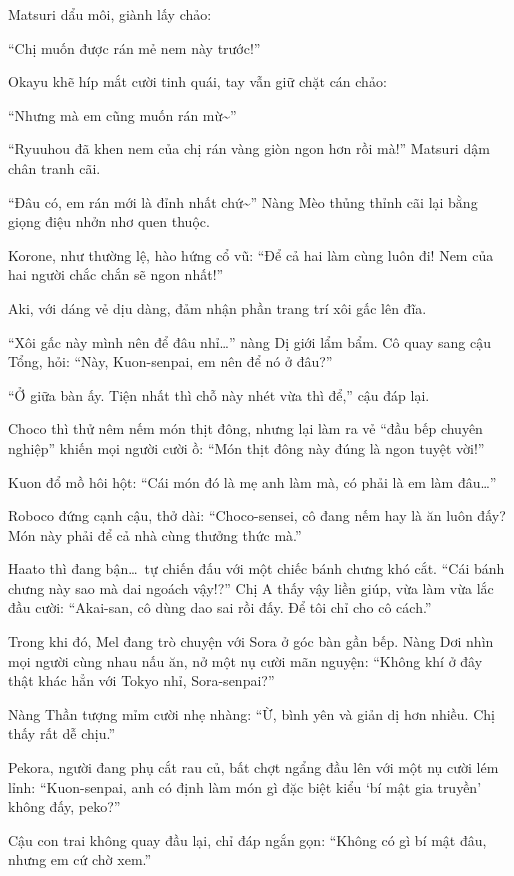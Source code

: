 \documentclass[../main.tex]{subfiles}
\begin{document}
Matsuri dẩu môi, giành lấy chảo:

``Chị muốn được rán mẻ nem này trước!''

Okayu khẽ híp mắt cười tinh quái, tay vẫn giữ chặt cán chảo:

``Nhưng mà em cũng muốn rán mừ\~{}''

``Ryuuhou đã khen nem của chị rán vàng giòn ngon hơn rồi mà!'' Matsuri dậm chân tranh cãi.

``Đâu có, em rán mới là đỉnh nhất chứ\~{}'' Nàng Mèo thủng thỉnh cãi lại bằng giọng điệu nhởn nhơ quen thuộc.

Korone, như thường lệ, hào hứng cổ vũ: ``Để cả hai làm cùng luôn đi! Nem của hai người chắc chắn sẽ ngon nhất!''

Aki, với dáng vẻ dịu dàng, đảm nhận phần trang trí xôi gấc lên đĩa.

``Xôi gấc này mình nên để đâu nhỉ\dots'' nàng Dị giới lẩm bẩm. Cô quay sang cậu Tổng, hỏi: ``Này, Kuon-senpai, em nên để nó ở đâu?''

``Ở giữa bàn ấy. Tiện nhất thì chỗ này nhét vừa thì để,'' cậu đáp lại.

Choco thì thử nêm nếm món thịt đông, nhưng lại làm ra vẻ ``đầu bếp chuyên nghiệp'' khiến mọi người cười ồ: ``Món thịt đông này đúng là ngon tuyệt vời!''

Kuon đổ mồ hôi hột: ``Cái món đó là mẹ anh làm mà, có phải là em làm đâu\dots''

Roboco đứng cạnh cậu, thở dài: ``Choco-sensei, cô đang nếm hay là ăn luôn đấy? Món này phải để cả nhà cùng thưởng thức mà.''

Haato thì đang bận\dots\ tự chiến đấu với một chiếc bánh chưng khó cắt. ``Cái bánh chưng này sao mà dai ngoách vậy!?'' Chị A thấy vậy liền giúp, vừa làm vừa lắc đầu cười: ``Akai-san, cô dùng dao sai rồi đấy. Để tôi chỉ cho cô cách.''

Trong khi đó, Mel đang trò chuyện với Sora ở góc bàn gần bếp. Nàng Dơi nhìn mọi người cùng nhau nấu ăn, nở một nụ cười mãn nguyện: ``Không khí ở đây thật khác hẳn với Tokyo nhỉ, Sora-senpai?''

Nàng Thần tượng mỉm cười nhẹ nhàng: ``Ừ, bình yên và giản dị hơn nhiều. Chị thấy rất dễ chịu.''

Pekora, người đang phụ cắt rau củ, bất chợt ngẩng đầu lên với một nụ cười lém lỉnh: ``Kuon-senpai, anh có định làm món gì đặc biệt kiểu `bí mật gia truyền' không đấy, peko?''

Cậu con trai không quay đầu lại, chỉ đáp ngắn gọn: ``Không có gì bí mật đâu, nhưng em cứ chờ xem.''
\end{document}
